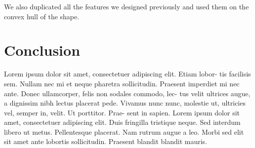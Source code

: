 \documentclass[a4paper, 11pt]{article}
\begin{document}
 We also duplicated all the features we designed previously and used them on the convex hull of the shape.

\newpage
\section{Conclusion}
Lorem ipsum dolor sit amet, consectetuer adipiscing elit. Etiam lobor-
tis facilisis sem. Nullam nec mi et neque pharetra sollicitudin. Praesent
imperdiet mi nec ante. Donec ullamcorper, felis non sodales commodo, lec-
tus velit ultrices augue, a dignissim nibh lectus placerat pede. Vivamus
nunc nunc, molestie ut, ultricies vel, semper in, velit. Ut porttitor. Prae-
sent in sapien. Lorem ipsum dolor sit amet, consectetuer adipiscing elit.
Duis fringilla tristique neque. Sed interdum libero ut metus. Pellentesque
placerat. Nam rutrum augue a leo. Morbi sed elit sit amet ante lobortis
sollicitudin. Praesent blandit blandit mauris.
\end{document}
